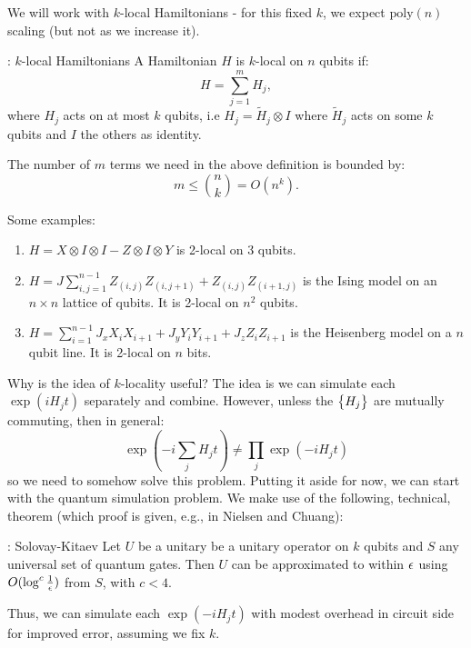 We will work with $k$-local Hamiltonians - for this fixed $k$, we expect $\text{poly}(n)$ scaling (but not as we increase it).

\begin{defbox}{: $k$-local Hamiltonians}
    A Hamiltonian $H$ is $k$-local on $n$ qubits if:
    \begin{equation}
        H = \sum_{j=1}^m H_j,
    \end{equation}
    where $H_j$ acts on at most $k$ qubits, i.e $H_j = \tilde{H}_j \otimes I$ where $\tilde{H}_j$ acts on some $k$ qubits and $I$ the others as identity.
\end{defbox}
The number of $m$ terms we need in the above definition is bounded by:
\begin{equation}
    m \leq \binom{n}{k} = O(n^k).
\end{equation}

Some examples:
\begin{enumerate}
    \item $H = X\otimes I \otimes I - Z \otimes I \otimes Y$ is 2-local on 3 qubits.
    \item $H = J\sum_{i, j=1}^{n-1}Z_{(i, j)}Z_{(i, j+1)} + Z_{(i, j)}Z_{(i+1, j)}$ is the Ising model on an $n \times n$ lattice of qubits. It is 2-local on $n^2$ qubits.
    \item $H = \sum_{i=1}^{n-1}J_xX_{i}X_{i+1} + J_yY_iY_{i+1} + J_zZ_{i}Z_{i+1}$ is the Heisenberg model on a $n$ qubit line. It is 2-local on $n$ bits.
\end{enumerate}
Why is the idea of $k$-locality useful? The idea is we can simulate each $\exp(iH_j t)$ separately and combine. However, unless the $\set{H_j}$ are mutually commuting, then in general:
\begin{equation}
    \exp(-i\sum_j H_j t) \neq \prod_j \exp(-iH_j t)
\end{equation}
so we need to somehow solve this problem. Putting it aside for now, we can start with the quantum simulation problem. We make use of the following, technical, theorem (which proof is given, e.g., in Nielsen and Chuang):
\begin{thmbox}{: Solovay-Kitaev}
    Let $U$ be a unitary be a unitary operator on $k$ qubits and $S$ any universal set of quantum gates. Then $U$ can be approximated to within $\epsilon$ using $O(\log^c\frac{1}{\epsilon})$ from $S$, with $c < 4$.
\end{thmbox}
Thus, we can simulate each $\exp(-iH_j t)$ with modest overhead in circuit side for improved error, assuming we fix $k$.

